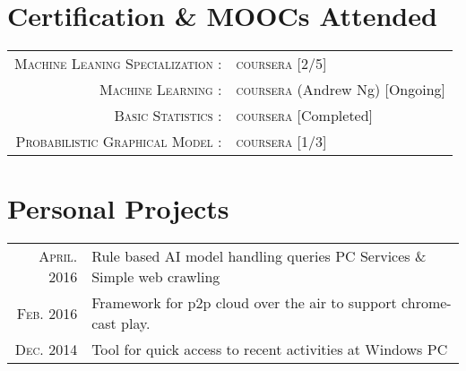 \documentclass[a4paper,10pt]{article}
\begin{document}
\section{Certification \& MOOC\textquotesingle s Attended}
\begin{tabular}{rl}

\textsc{Machine Leaning Specialization :} & \textsc{coursera} [2/5]\\
\textsc{Machine Learning :} & \textsc{coursera} (\small Andrew Ng) [Ongoing]\\
\textsc{Basic Statistics :} & \textsc{coursera} [Completed]\\
\textsc{Probabilistic Graphical Model :} & \textsc{coursera} [1/3] \\


\end{tabular}

\section{Personal Projects}
\begin{tabular}{rl}

\textsc{April.} 2016 & Rule based AI model handling queries PC Services \& Simple web crawling \\
\textsc{Feb.} 2016 & Framework for p2p cloud over the air to support chrome-cast play. \\
\textsc{Dec.} 2014 & Tool for quick access to recent activities at Windows PC\\


\end{tabular}
\end{document}
